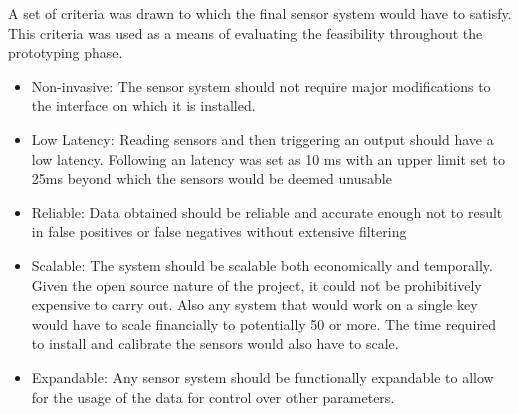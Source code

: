 A set of criteria was drawn to which the final sensor system would have
to satisfy. This criteria was used as a means of evaluating the
feasibility throughout the prototyping phase.

\begin{itemize}
\item
  Non-invasive: The sensor system should not require major modifications
  to the interface on which it is installed.
\item
  Low Latency: Reading sensors and then triggering an output should have
  a low latency. Following \cite{Jack2016} an latency was set as 10 ms
  with an upper limit set to 25ms beyond which the sensors would be
  deemed unusable
\item
  Reliable: Data obtained should be reliable and accurate enough not to
  result in false positives or false negatives without extensive
  filtering
\item
  Scalable: The system should be scalable both economically and
  temporally. Given the open source nature of the project, it could not
  be prohibitively expensive to carry out. Also any system that would
  work on a single key would have to scale financially to potentially 50
  or more. The time required to install and calibrate the sensors would
  also have to scale.
\item
  Expandable: Any sensor system should be functionally expandable to
  allow for the usage of the data for control over other parameters.
\end{itemize}






